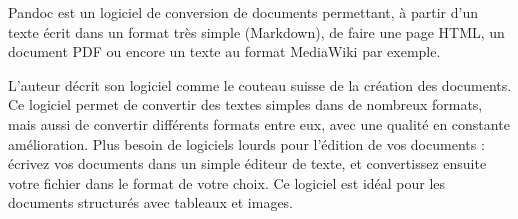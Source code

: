 \documentclass[]{article}
\begin{document}
Pandoc est un logiciel de conversion de documents permettant, à partir
d'un texte écrit dans un format très simple (Markdown), de faire une
page HTML, un document PDF ou encore un texte au format MediaWiki par
exemple.

L'auteur décrit son logiciel comme le couteau suisse de la création des
documents. Ce logiciel permet de convertir des textes simples dans de
nombreux formats, mais aussi de convertir différents formats entre eux,
avec une qualité en constante amélioration. Plus besoin de logiciels
lourds pour l'édition de vos documents : écrivez vos documents dans un
simple éditeur de texte, et convertissez ensuite votre fichier dans le
format de votre choix. Ce logiciel est idéal pour les documents
structurés avec tableaux et images.
\end{document}
